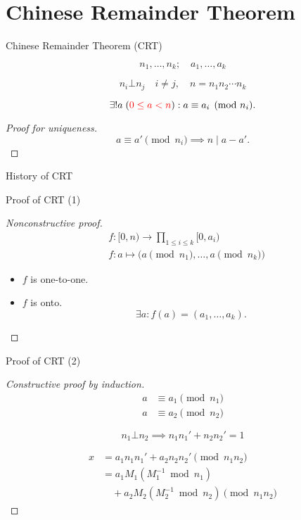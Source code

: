 \section{Chinese Remainder Theorem}

\begin{frame}{Chinese Remainder Theorem (CRT)}
  \begin{theorem}[CRT]
	\[
	  n_1, \ldots, n_k; \quad a_1, \ldots, a_k
	\]

	\[ 
	  n_i \bot n_j \quad i \neq j, \quad n = n_1n_2\cdots n_k 
	\]

    \[
	  \exists! a\; (\textcolor{red}{0 \le a < n}): a \equiv a_i \pmod{n_i}.
	\]
  \end{theorem}

  \begin{proof}[Proof for uniqueness]
	\[
	  a \equiv a' \pmod{n_i} \implies n \mid a - a'.
	\]
  \end{proof}
\end{frame}
\begin{frame}{History of CRT}
  \begin{quote}
  \end{quote}
\end{frame}
\begin{frame}{Proof of CRT (1)}
  \begin{proof}[Nonconstructive proof]
	\begin{align*}
	  &f: [0,n) \to \prod_{1 \le i \le k} [0,a_i) \\
	  &f: a \mapsto \big( a \pmod{n_1}, \dots, a \pmod{n_k} \big)
	\end{align*}

	\begin{itemize}
	  \item $f$ is one-to-one.
	  \item $f$ is onto.
		\[
		  \exists a: f(a) = (a_1, \dots, a_k).
		\]
	\end{itemize}
  \end{proof}
\end{frame}
\begin{frame}{Proof of CRT (2)}
  \begin{proof}[Constructive proof by induction]
	\begin{align*}
	  a &\equiv a_1 \pmod{n_1} \\
	  a &\equiv a_2 \pmod{n_2}
	\end{align*}

	\[
	  n_1 \bot n_2 \implies n_1n_1' + n_2n_2' = 1
	\]

	\begin{align*}
	  x &= a_1n_1n_1' + a_2n_2n_2' \pmod{n_1n_2} \\
		&= a_1M_1(M_1^{-1} \bmod n_1) \\
		&\quad + a_2M_2(M_2^{-1} \bmod n_2) \pmod{n_1n_2}
	\end{align*}
  \end{proof}
\end{frame}
